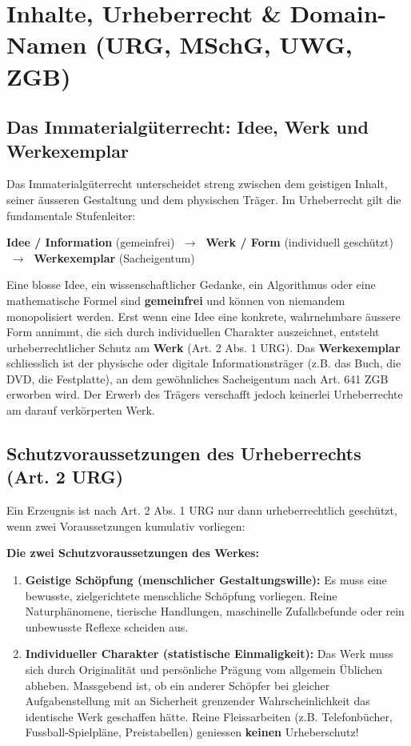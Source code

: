\section{Inhalte, Urheberrecht \& Domain-Namen (URG, MSchG, UWG, ZGB)}

\subsection{Das Immaterialgüterrecht: Idee, Werk und Werkexemplar}

Das Immaterialgüterrecht unterscheidet streng zwischen dem geistigen Inhalt, seiner äusseren Gestaltung und dem physischen Träger. Im Urheberrecht gilt die fundamentale Stufenleiter:
\begin{center}
    \textbf{Idee / Information} (gemeinfrei) $\;\longrightarrow\;$ \textbf{Werk / Form} (individuell geschützt) $\;\longrightarrow\;$ \textbf{Werkexemplar} (Sacheigentum)
\end{center}

Eine blosse Idee, ein wissenschaftlicher Gedanke, ein Algorithmus oder eine mathematische Formel sind \textbf{gemeinfrei} und können von niemandem monopolisiert werden. Erst wenn eine Idee eine konkrete, wahrnehmbare äussere Form annimmt, die sich durch individuellen Charakter auszeichnet, entsteht urheberrechtlicher Schutz am \textbf{Werk} (Art. 2 Abs. 1 URG). Das \textbf{Werkexemplar} schliesslich ist der physische oder digitale Informationsträger (z.B. das Buch, die DVD, die Festplatte), an dem gewöhnliches Sacheigentum nach Art. 641 ZGB erworben wird. Der Erwerb des Trägers verschafft jedoch keinerlei Urheberrechte am darauf verkörperten Werk.

\subsection{Schutzvoraussetzungen des Urheberrechts (Art. 2 URG)}

Ein Erzeugnis ist nach Art. 2 Abs. 1 URG nur dann urheberrechtlich geschützt, wenn zwei Voraussetzungen kumulativ vorliegen:

\begin{definition}
    \textbf{Die zwei Schutzvoraussetzungen des Werkes:}
    \begin{enumerate}
        \item \textbf{Geistige Schöpfung (menschlicher Gestaltungswille):} Es muss eine bewusste, zielgerichtete menschliche Schöpfung vorliegen. Reine Naturphänomene, tierische Handlungen, maschinelle Zufallsbefunde oder rein unbewusste Reflexe scheiden aus.
        \item \textbf{Individueller Charakter (statistische Einmaligkeit):} Das Werk muss sich durch Originalität und persönliche Prägung vom allgemein Üblichen abheben. Massgebend ist, ob ein anderer Schöpfer bei gleicher Aufgabenstellung mit an Sicherheit grenzender Wahrscheinlichkeit das identische Werk geschaffen hätte. Reine Fleissarbeiten (z.B. Telefonbücher, Fussball-Spielpläne, Preistabellen) geniessen \textbf{keinen} Urheberschutz!
    \end{enumerate}
\end{definition}


